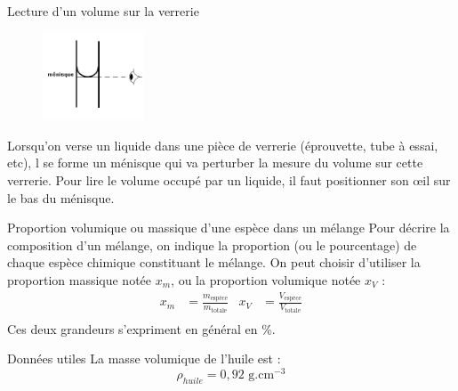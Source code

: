 \begin{doc}{Lecture d'un volume sur la verrerie}

\begin{figure}
\vspace{-2cm}
    \centering
      \includegraphics[width=0.27\textwidth]{Images/Lecture_Verrerie.png}
  \end{figure}
  Lorsqu'on verse un liquide dans une pièce de verrerie (éprouvette, tube à essai, etc), l se forme un ménisque qui va perturber la mesure du volume sur cette verrerie. Pour lire le volume occupé par un liquide, il faut positionner son \oe il sur le bas du ménisque.%
\end{doc}

\begin{doc}{Proportion volumique ou massique d’une espèce dans un mélange}
Pour décrire la composition d’un mélange, on indique la proportion (ou le pourcentage) de chaque espèce chimique constituant le mélange. On peut choisir d’utiliser la proportion massique notée $x_m$, ou la proportion volumique notée $x_V$ :
\begin{align*}
    x_m &= \frac{m_{\text{espèce}}}{m_{\text{totale}}} & x_V & = \frac{V_{\text{espèce}}}{V_{\text{totale}}}\\
\end{align*}
Ces deux grandeurs s'expriment en général en \%.
\end{doc}

\begin{doc}{Données utiles}
La masse volumique de l'huile est :
\begin{equation*}
    \rho_{huile} = 0,92 \text{~g.cm$^{-3}$}
    \end{equation*}
\end{doc}
